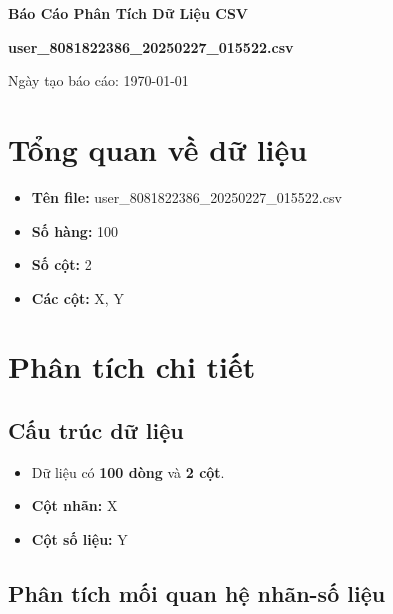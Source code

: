 \documentclass[12pt,a4paper]{article}
\begin{document}
\begin{titlepage}
    \centering
    \vspace*{\fill}
    \Huge
    \textbf{Báo Cáo Phân Tích Dữ Liệu CSV}
    
    \vspace{0.5cm}
    \Large
    \textbf{user\_8081822386\_20250227\_015522.csv}
    
    \vspace{1cm}
    
    \large
    Ngày tạo báo cáo: \today
    \vspace*{\fill}
\end{titlepage}

\tableofcontents
\newpage

\section{Tổng quan về dữ liệu}

\begin{itemize}
    \item \textbf{Tên file:} user\_8081822386\_20250227\_015522.csv
    \item \textbf{Số hàng:} 100
    \item \textbf{Số cột:} 2
    \item \textbf{Các cột:} X, Y
\end{itemize}

\section{Phân tích chi tiết}

\subsection{Cấu trúc dữ liệu}
\begin{itemize}
    \item Dữ liệu có \textbf{100 dòng} và \textbf{2 cột}.
    \item \textbf{Cột nhãn:} X
    \item \textbf{Cột số liệu:} Y
\end{itemize}

\subsection{Phân tích mối quan hệ nhãn-số liệu}
\end{document}

